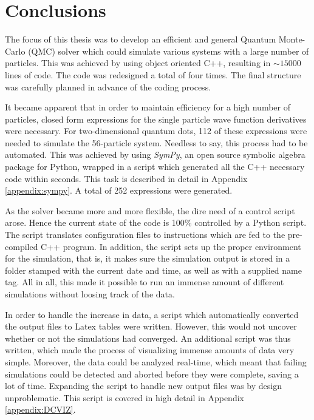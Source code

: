 \chapter{Conclusions}

The focus of this thesis was to develop an efficient and general Quantum Monte-Carlo (QMC) solver which could simulate various systems with a large number of particles. This was achieved by using object oriented C++, resulting in $\sim15000$ lines of code. The code was redesigned a total of four times. The final structure was carefully planned in advance of the coding process.

It became apparent that in order to maintain efficiency for a high number of particles, closed form expressions for the single particle wave function derivatives were necessary. For two-dimensional quantum dots, 112 of these expressions were needed to simulate the 56-particle system. Needless to say, this process had to be automated. This was achieved by using \textit{SymPy}, an open source symbolic algebra package for Python, wrapped in a script which generated all the C++ necessary code within seconds. This task is described in detail in Appendix \ref{appendix:sympy}. A total of 252 expressions were generated.

As the solver became more and more flexible, the dire need of a control script arose. Hence the current state of the code is 100\% controlled by a Python script. The script translates configuration files to instructions which are fed to the pre-compiled C++ program. In addition, the script sets up the proper environment for the simulation, that is, it makes sure the simulation output is stored in a folder stamped with the current date and time, as well as with a supplied name tag. All in all, this made it possible to run an immense amount of different simulations without loosing track of the data.

In order to handle the increase in data, a script which automatically converted the output files to Latex tables were written. However, this would not uncover whether or not the simulations had converged. An additional script was thus written, which made the process of visualizing immense amounts of data very simple. Moreover, the data could be analyzed real-time, which meant that failing simulations could be detected and aborted before they were complete, saving a lot of time. Expanding the script to handle new output files was by design unproblematic. This script is covered in high detail in Appendix \ref{appendix:DCVIZ}.

